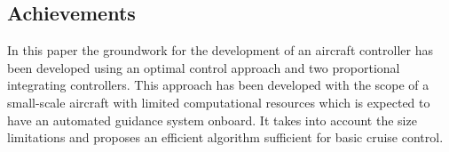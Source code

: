 \documentclass[twocolumn,showpacs,
    nofootinbib,aps,superscriptaddress,
    eqsecnum,prd,showkeys,10pt,floatfix]{revtex4}
\begin{document}
\subsection*{Achievements}
In this paper the groundwork for the development of an aircraft controller has
been developed using an optimal control approach and two proportional
integrating controllers. This approach has been developed with the scope of a
small-scale aircraft with limited computational resources which is expected to
have an automated guidance system onboard. It takes into account the size
limitations and proposes an efficient algorithm sufficient for basic cruise
control.

\end{document}
